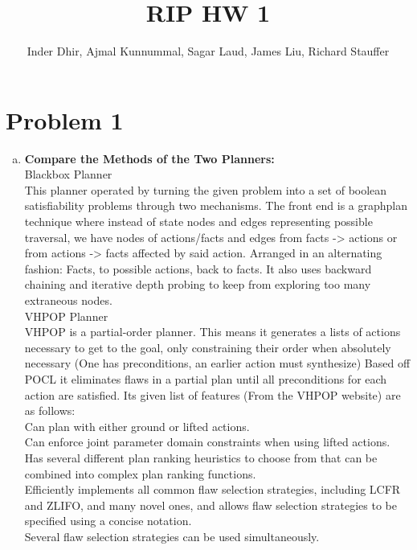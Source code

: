 \documentclass[]{article}
\title{RIP HW 1}
\author{Inder Dhir, Ajmal Kunnummal, Sagar Laud, James Liu, Richard Stauffer}
\begin{document}
\maketitle


\section{Problem 1}
	\begin{enumerate}[(a)]
	\item \textbf{Compare the Methods of the Two Planners:}\\
	Blackbox Planner\\
		This planner operated by turning the given problem into a set of boolean satisfiability problems through two mechanisms. The front end is a graphplan technique where instead of state nodes and edges representing possible traversal, we have nodes of actions/facts and edges from facts -> actions or from actions -> facts affected by said action. Arranged in an alternating fashion: Facts, to possible actions, back to facts. It also uses backward chaining and iterative depth probing to keep from exploring too many extraneous nodes. \\
	
	VHPOP Planner\\
		VHPOP is a partial-order planner. This means it generates a lists of actions necessary to get to the goal, only constraining their order when absolutely necessary (One has preconditions, an earlier action must synthesize) Based off POCL it eliminates flaws in a partial plan until all preconditions for each action are satisfied. Its given list of features (From the VHPOP website) are as follows:\\
		
		Can plan with either ground or lifted actions.\\
		
		 Can enforce joint parameter domain constraints when using lifted actions.\\
		 
		 Has several different plan ranking heuristics to choose from that can be combined into complex plan ranking functions.\\
		 
		 Efficiently implements all common flaw selection strategies, including LCFR and ZLIFO, and many novel ones, and allows flaw selection strategies to be specified using a concise notation.\\
		 
		 Several flaw selection strategies can be used simultaneously.\\
		 

\end{enumerate}
\end{document}
